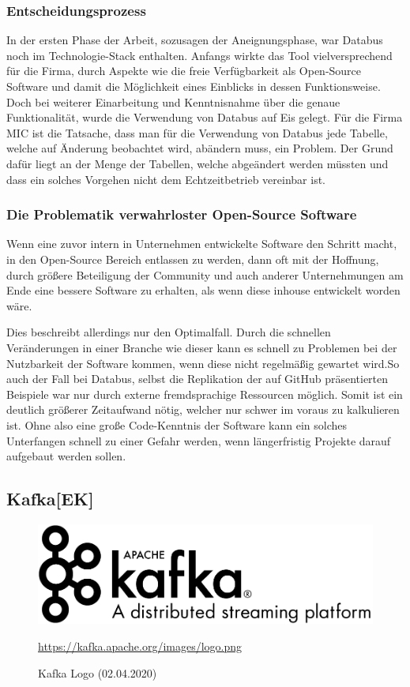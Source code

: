 \subsubsection{Entscheidungsprozess}
In der ersten Phase der Arbeit, sozusagen der Aneignungsphase, war Databus noch im Technologie-Stack enthalten. Anfangs wirkte das Tool vielversprechend für die Firma, durch Aspekte wie die freie Verfügbarkeit als Open-Source Software und damit die Möglichkeit eines Einblicks in dessen Funktionsweise. Doch bei weiterer Einarbeitung und Kenntnisnahme über die genaue Funktionalität, wurde die Verwendung von Databus auf Eis gelegt. Für die Firma MIC ist die Tatsache, dass man für die Verwendung von Databus jede Tabelle, welche auf Änderung beobachtet wird, abändern muss, ein Problem. Der Grund dafür liegt an der Menge der Tabellen, welche abgeändert werden müssten und dass ein solches Vorgehen nicht dem Echtzeitbetrieb vereinbar ist.

\subsubsection{Die Problematik verwahrloster Open-Source Software}
Wenn eine zuvor intern in Unternehmen entwickelte Software den Schritt macht, in den Open-Source Bereich entlassen zu werden, dann oft mit der Hoffnung, durch größere Beteiligung der Community und auch anderer Unternehmungen am Ende eine bessere Software zu erhalten, als wenn diese inhouse entwickelt worden wäre.
\vspace{5mm}\par
Dies beschreibt allerdings nur den Optimalfall. Durch die schnellen Veränderungen in einer Branche wie dieser kann es schnell zu Problemen bei der Nutzbarkeit der Software kommen, wenn diese nicht regelmäßig gewartet wird.So auch der Fall bei Databus, selbst die Replikation der auf GitHub präsentierten Beispiele war nur durch externe fremdsprachige Ressourcen möglich. Somit ist ein deutlich größerer Zeitaufwand  nötig, welcher nur schwer im voraus zu kalkulieren ist. Ohne also eine große Code-Kenntnis der Software kann ein solches Unterfangen schnell zu einer Gefahr werden, wenn längerfristig Projekte darauf aufgebaut werden sollen. 
\newpage
\subsection{Kafka[EK]}
\begin{figure}[H]
    \centering
    \includegraphics[scale=0.4]{images/kafka_logo.png}
    \caption{Kafka Logo (02.04.2020)}
    \url{https://kafka.apache.org/images/logo.png}
\end{figure}
